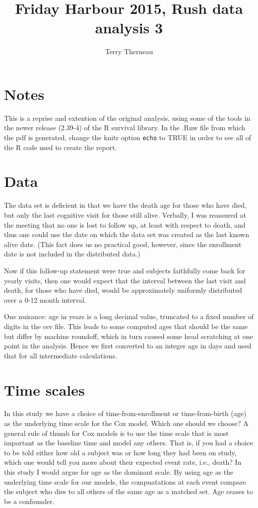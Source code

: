 \documentclass[11pt]{article}
\title{Friday Harbour 2015, Rush data analysis 3}
\author{Terry Therneau}
\newcommand{\code}[1]{\texttt{#1}}
\begin{document}




\maketitle
\section{Notes}
  This is a reprise and extention of the original analysis, using some
of the tools in the newer release (2.39-4) of the R survival library.
In the .Rnw file from which the pdf is generated, change the knitr
option \code{echo} to TRUE in order to see all of the R code used to
create the report.  

\section{Data}
The data set is deficient in that we have the death age for those who
have died, but only the last cognitive visit for those still alive.
Verbally, I was reassured at the meeting that no one is lost to follow
up, at least with respect to death, and thus one could use the date on which
the data set was created as the last known alive date.
(This fact does us no practical good, however, since the enrollment date is
not included in the distributed data.)

Now if this follow-up statement were true and subjects faithfully come back
for yearly visits, 
then one would expect that the interval between
the last visit and death, for those who have died, would be approximately
uniformly distributed over a 0-12 month interval.

One nuisance: age in years is a long decimal value, truncated to a fixed number
of digits in the csv file.  This leads to some computed ages that should be the
same but differ by machine roundoff, which in turn caused some head scratching
at one point in the analysis.  Hence we first converted to an
integer age in days and used that for all intermediate calculations.

\section{Time scales}
In this study we have a choice of time-from-enrollment or time-from-birth (age)
as the underlying time scale for the Cox model.  
Which one should we choose?
A general rule of thumb for Cox models is to use the time scale that is
most important as the baseline time and model any others.
That is, if you had a choice to be told either how old a subject was or how
long they had been on study, which one would tell you more about their
expected event rate, i.e., death?   In this study I would argue for age
as the dominant scale.
By using age as the underlying time scale for our models, the compuatations 
at each event compare the subject who dies to all others of the 
same age as a matched set.  Age ceases to be a confounder.
\end{document}
